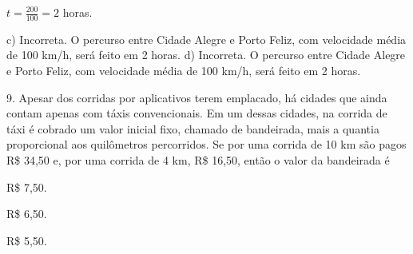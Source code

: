 \begin{escolha}
\begin{boxmedio}
\begin{boxmedio}
{\begin{boxpeq}
\begin{boxpeq}
{\begin{boxpeq}
\begin{boxmedio}
\begin{boxmedio}
\begin{boxpeq}
\begin{boxmedio}
\begin{boxpeq}
\begin{boxpeq}
\begin{boxpeq}
\begin{boxpeq}
\begin{boxmedio}
{\begin{boxmedio}
\begin{boxmedio}
\begin{boxpeq}
\begin{boxmedio}
\begin{boxpeq}
\begin{boxpeq}
\begin{boxpeq}
\begin{escolha}
{\begin{boxmedio}
\begin{boxpeq}
\begin{boxpeq}
\begin{boxpeq}
\begin{boxpeq}
\begin{boxpeq}
\begin{boxmedio}
\begin{boxpeq}
\begin{boxpeq}
\begin{boxpeq}
{\begin{boxpeq}
\begin{boxmedio}
\begin{boxpeq}
\begin{boxpeq}
\begin{boxpeq}
{\begin{boxpeq}
\begin{boxmedio}
{\begin{boxpeq}
\begin{boxpeq}
\begin{boxmedio}
\begin{boxmedio}
\begin{boxpeq}
\begin{boxpeq}
{\begin{boxpeq}
\begin{boxpeq}
\begin{boxpeq}
\begin{boxpeq}
\begin{boxpeq}
\begin{escolha}
\begin{escolha}
{\begin{boxmedio}
\begin{boxpeq}
\begin{q°}
\begin{boxmedio}
\begin{boxpeq}
\begin{boxpeq}
\begin{boxmedio}
\begin{boxmedio}
\begin{boxmedio}
\begin{boxmedio}
{\begin{enumerate}
\begin{boxpeq}
{\begin{boxpeq}
\begin{boxpeq}
\begin{boxmedio}
\begin{boxpeq}
\begin{boxpeq}
\begin{boxpeq}
\begin{escolha}
\begin{escolha}
{$t = \frac{200}{100} = 2$ horas.

c) Incorreta. O percurso entre Cidade Alegre e Porto Feliz, com velocidade 
média de 100 km/h, será feito em 2 horas. 
d) Incorreta. O percurso entre Cidade Alegre e Porto Feliz, com velocidade 
média de 100 km/h, será feito em 2 horas.} 

9. Apesar dos corridas por aplicativos terem emplacado, há cidades que ainda
contam apenas com táxis convencionais. Em um dessas cidades, na corrida de 
táxi é cobrado um valor inicial fixo, chamado de bandeirada, mais a quantia
proporcional aos quilômetros percorridos. Se por uma corrida de 10 km são pagos
R\$ 34,50 e, por uma corrida de 4 km, R\$ 16,50, então o valor da bandeirada é

\begin{escolha}

  \item R\$ 7,50.

  \item R\$ 6,50.

  \item R\$ 5,50.


\end{escolha}
\end{escolha}
\end{escolha}
\end{boxpeq}
\end{boxpeq}
\end{boxpeq}
\end{boxmedio}
\end{boxpeq}
\end{boxpeq}}
\end{boxpeq}
\end{enumerate}}
\end{boxmedio}
\end{boxmedio}
\end{boxmedio}
\end{boxmedio}
\end{boxpeq}
\end{boxpeq}
\end{boxmedio}
\end{q°}
\end{boxpeq}
\end{boxmedio}}
\end{escolha}
\end{escolha}
\end{boxpeq}
\end{boxpeq}
\end{boxpeq}
\end{boxpeq}
\end{boxpeq}}
\end{boxpeq}
\end{boxpeq}
\end{boxmedio}
\end{boxmedio}
\end{boxpeq}
\end{boxpeq}}
\end{boxmedio}
\end{boxpeq}}
\end{boxpeq}
\end{boxpeq}
\end{boxpeq}
\end{boxmedio}
\end{boxpeq}}
\end{boxpeq}
\end{boxpeq}
\end{boxpeq}
\end{boxmedio}
\end{boxpeq}
\end{boxpeq}
\end{boxpeq}
\end{boxpeq}
\end{boxpeq}
\end{boxmedio}}
\end{escolha}
\end{boxpeq}
\end{boxpeq}
\end{boxpeq}
\end{boxmedio}
\end{boxpeq}
\end{boxmedio}
\end{boxmedio}}
\end{boxmedio}
\end{boxpeq}
\end{boxpeq}
\end{boxpeq}
\end{boxpeq}
\end{boxmedio}
\end{boxpeq}
\end{boxmedio}
\end{boxmedio}
\end{boxpeq}}
\end{boxpeq}
\end{boxpeq}}
\end{boxmedio}
\end{boxmedio}
\end{escolha}
